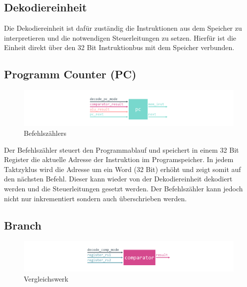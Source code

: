         \subsection{Dekodiereinheit}
            
            Die Dekodiereinheit ist dafür zuständig die Instruktionen aus dem Speicher zu interpretieren und die notwendigen
            Steuerleitungen zu setzen.
            Hierfür ist die Einheit direkt über den 32 Bit Instruktionbus mit dem Speicher verbunden.

        \subsection{Programm Counter (PC)}\label{lab:pc}

            \begin{figure}[H]
                \centering
                \includegraphics[scale=1]{img/block_pc.pdf}
                \caption{Befehlszählers}
                \label{fig:pc}
            \end{figure}

            Der Befehlszähler steuert den Programmablauf und speichert in einem 32 Bit Register
            die aktuelle Adresse der Instruktion im Programspeicher.
            In jedem Taktzyklus wird die Adresse um ein Word (32 Bit) erhöht und zeigt somit
            auf den nächsten Befehl. Dieser kann wieder von der Dekodiereinheit dekodiert werden
            und die Steuerleitungen gesetzt werden. Der Befehlszähler kann jedoch nicht nur
            inkrementiert sondern auch überschrieben werden.

            

        \subsection{Branch}


            \begin{figure}[H]
                \centering
                \includegraphics[scale=1]{img/block_comparator.pdf}
                \caption{Vergleichswerk}
                \label{fig:alu}
            \end{figure}

